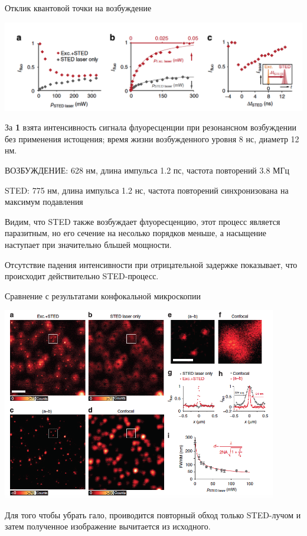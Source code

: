 \documentclass[9pt, compress, xcolor=table]{beamer}
\begin{document}
\begin{frame}{Отклик квантовой точки на возбуждение}
\begin{center}
\includegraphics[width=\textwidth]{ffm23}
\end{center}

{\small За \textbf{1} взята интенсивность сигнала флуоресценции при резонансном возбуждении без применения истощения; время жизни возбужденного уровня 8 нс, диаметр 12 нм.

ВОЗБУЖДЕНИЕ: 628 нм, длина импульса 1.2 пс, частота повторений 3.8 МГц

STED: 775 нм, длина импульса 1.2 нс, частота повторений синхронизована на максимум подавления

Видим, что STED также возбуждает флуоресценцию, этот процесс является паразитным, но его сечение на несолько порядков меньше, а насыщение наступает при значительно бльшей мощности.

Отсутствие падения интенсивности при отрицательной задержке показывает, что происходит действительно STED-процесс.}

\end{frame}
\begin{frame}{Сравнение с результатами конфокальной микроскопии}
\begin{center}
\includegraphics[width=0.9\textwidth]{ffm24}

Для того чтобы убрать гало, проиводится повторный обход только STED-лучом и затем полученное изображение вычитается из исходного.

\end{center}
\end{frame}
\end{document}
